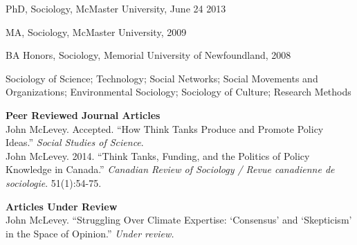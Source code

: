 \documentclass[11pt,usenames,dvipsnames]{article}
\begin{document}
\medskip 
{}

\noindent PhD, Sociology, McMaster University, June 24 2013



\noindent MA, Sociology, McMaster University, 2009

\noindent BA Honors, Sociology, Memorial University of Newfoundland, 2008 \\



\noindent Sociology of Science; Technology; Social Networks; Social Movements and Organizations; Environmental Sociology; Sociology of Culture; Research Methods \\



\ind \textbf{Peer Reviewed Journal Articles} \\

\ind John McLevey. Accepted. ``How Think Tanks Produce and Promote Policy Ideas.'' \emph{Social Studies of Science}. \\

\ind John McLevey. 2014. ``Think Tanks, Funding, and the Politics of Policy Knowledge in Canada.'' \emph{Canadian Review of Sociology / Revue canadienne de sociologie}. 51(1):54-75.\\


\ind \textbf{Articles Under Review} \\

\ind John McLevey. ``Struggling Over Climate Expertise: `Consensus' and `Skepticism' in the Space of Opinion.'' \emph{Under review.}   \\ %
\end{document}
